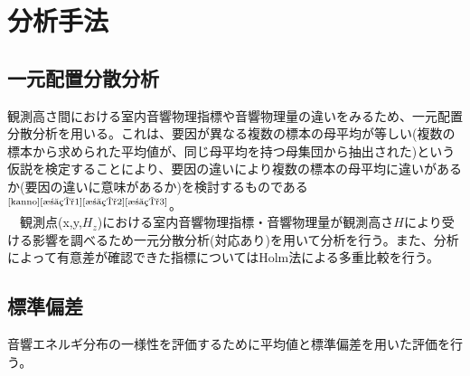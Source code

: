 \chapter{分析手法}

\section{一元配置分散分析}
観測高さ間における室内音響物理指標や音響物理量の違いをみるため、一元配置分散分析を用いる。これは、要因が異なる複数の標本の母平均が等しい(複数の標本から求められた平均値が、同じ母平均を持つ母集団から抽出された)という仮説を検定することにより、要因の違いにより複数の標本の母平均に違いがあるか(要因の違いに意味があるか)を検討するものである$^{\text{\cite{kanno}{\cite{池田1}{\cite{池田2}{\cite{池田3}}}}}}$。
\\　観測点(x,y,$H_z$)における室内音響物理指標・音響物理量が観測高さ$H$により受ける影響を調べるため一元分散分析(対応あり)を用いて分析を行う。また、分析によって有意差が確認できた指標についてはHolm法による多重比較を行う。

\section{標準偏差}
音響エネルギ分布の一様性を評価するために平均値と標準偏差を用いた評価を行う。

